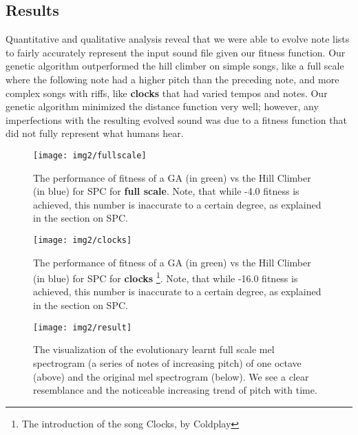 \documentclass{pnastwo}
\begin{document}
\begin{article}
\subsection{Results}
Quantitative and qualitative analysis reveal that we were able to evolve note lists to fairly accurately represent the input sound file given our fitness function. Our genetic algorithm outperformed the hill climber on simple songs, like a full scale where the following note had a higher pitch than the preceding note, and more complex songs with riffs, like \textbf{clocks} that had varied tempos and notes. Our genetic algorithm minimized the distance function very well; however, any imperfections with the resulting evolved sound was due to a fitness function that did not fully represent what humans hear.
\begin{figure}
\centerline{\texttt{[image: img2/fullscale]}}
\caption{The performance of fitness of a GA (in green) vs the Hill Climber (in blue) for SPC for \textbf{full scale}. Note, that while -4.0 fitness is achieved, this number is inaccurate to a certain degree, as explained in the section on SPC.}\label{fig7}
\end{figure}

\begin{figure}
\centerline{\texttt{[image: img2/clocks]}}
\caption{The performance of fitness of a GA (in green) vs the Hill Climber (in blue) for SPC for \textbf{clocks} \footnote{The introduction of the song Clocks, by Coldplay}. Note, that while -16.0 fitness is achieved, this number is inaccurate to a certain degree, as explained in the section on SPC.}\label{fig8}
\end{figure}

\begin{figure}
\centerline{\texttt{[image: img2/result]}}
\caption{The visualization of the evolutionary learnt full scale mel spectrogram (a series of notes of increasing pitch) of one octave (above) and the original mel spectrogram (below). We see a clear resemblance and the noticeable increasing trend of pitch with time.}\label{fig4}
\end{figure}



\end{article}
\end{document}
